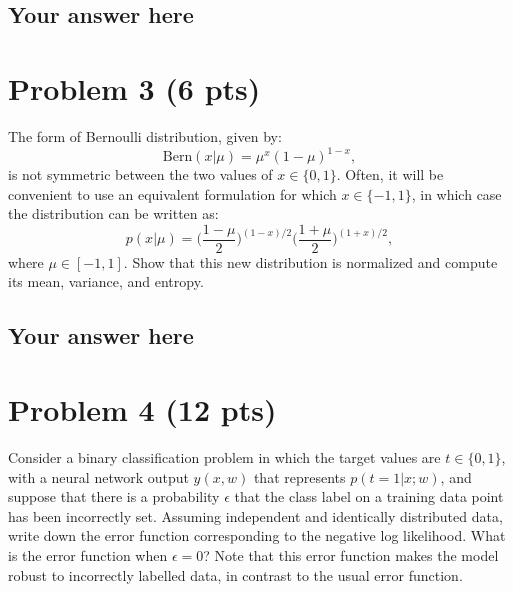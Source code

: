 \documentclass{article}
\begin{document}
\subsection*{Your answer here}



\section*{Problem 3 (6 pts)}

The form of Bernoulli distribution, given by:
\begin{equation}
\textrm{Bern}(x | \mu) = \mu^x (1-\mu)^{1-x},
\nonumber
\end{equation}
is not symmetric between the two values of $x\in \{0,1\}$. Often, it will be
convenient to use an equivalent formulation for which $x \in \{-1,1\}$, in which case
the distribution can be written as:
\begin{equation}
 p(x | \mu) = \bigg(\frac{1-\mu}{2}\bigg)^{(1-x)/2}
  \bigg(\frac{1+\mu}{2}\bigg)^{(1+x)/2},
\nonumber
\end{equation}
where $\mu \in [-1,1]$. Show that this new distribution is normalized and compute
its mean, variance, and entropy.

\subsection*{Your answer here}


\section*{Problem 4 (12 pts)}
Consider a binary classification problem in which the target 
values are $t \in  \{0, 1\}$, with a neural 
network output $y(x, w)$ that represents $p(t = 1|x; w)$, and suppose that there is
 a probability $\epsilon$  that the class label on a training data point has been incorrectly set. 
Assuming independent and identically distributed data, write down the error function corresponding to the negative log likelihood. 
What is the error function when $\epsilon=0$? 
Note that this error function makes the model robust to incorrectly labelled data, in contrast to the usual error function.
\end{document}
